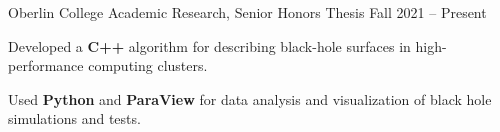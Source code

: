 \begin{entry}{Oberlin College}
	\entryItem
		{Academic Research, Senior Honors Thesis}
		{Fall 2021 -- Present}
		
		\begin{items}
			\item Developed a \textbf{C++} algorithm for describing black-hole surfaces in high-performance computing clusters.
			\item Used \textbf{Python} and \textbf{ParaView} for data analysis and visualization of black hole simulations and tests.
		\end{items}
\end{entry}
